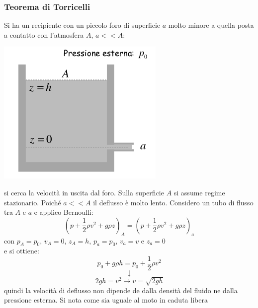 \documentclass[a4paper,12pt, oneside]{book}
\begin{document}
\subsubsection{Teorema di Torricelli}
Si ha un recipiente con un piccolo foro di superficie $a$ molto minore a quella posta a contatto con l'atmosfera $A$, $a<<A$:
\begin{center}
	\includegraphics[scale=0.5]{img/flu7.png}
\end{center}
si cerca la velocità in uscita dal foro. Sulla superficie $A$ si assume regime stazionario. Poiché $a<<A$ il deflusso è molto lento. Considero un tubo di flusso tra $A$ e $a$ e applico Bernoulli:
$$\left(p+\frac{1}{2}\rho v^2+g\rho z\right)_A=\left(p+\frac{1}{2}\rho v^2+g\rho z\right)_a$$
con $p_A=p_0$, $v_A=0$, $z_A=h$, $p_a=p_0$, $v_a=v$ e $z_a=0$\\
e si ottiene:
$$p_0+g\rho h=p_0+\frac{1}{2}\rho v^2$$
$$\downarrow$$
$$2gh=v^2\to v=\sqrt{2gh}$$
quindi la velocità di deflusso non dipende de dalla densità del fluido ne dalla pressione esterna. Si nota come sia uguale al moto in caduta libera
\newpage
\end{document}
